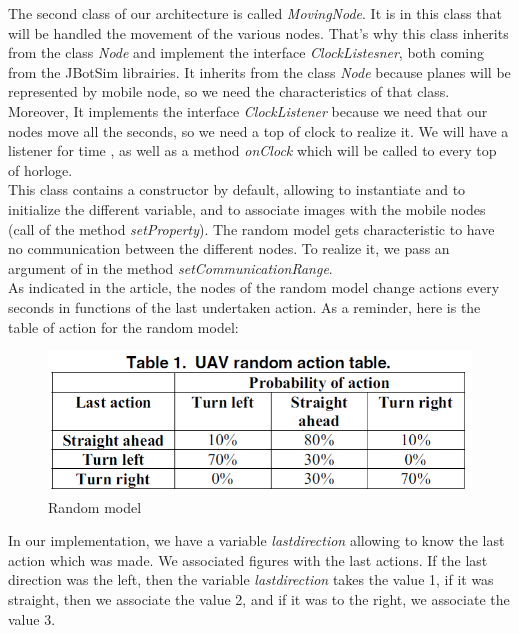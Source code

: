 The second class of our architecture is called \textit{MovingNode}. It is in this class that will be handled the movement of the various nodes. That's why this class inherits from the class \textit{Node} and implement the interface \textit{ClockListesner}, both coming from the JBotSim librairies. It inherits from the class \textit{Node} because planes will be represented by mobile node, so we need the characteristics of that class. Moreover, It implements the interface \textit{ClockListener} because we need that our nodes move all the seconds, so we need a top of clock to realize it. We will have a listener for time , as well as a method \textit{onClock} which will be called to every top of horloge.\\

This class contains a constructor by default, allowing to instantiate and to initialize the different variable, and to associate images with the mobile nodes (call of the method \textit{setProperty}). The random model gets characteristic to have no communication between the different nodes. To realize it, we pass an argument of  in the method \textit{setCommunicationRange}.\\

As indicated in the article, the nodes of the random model change actions every seconds in functions of the last undertaken action. As a reminder, here is the table of action for the random model:\\

\begin{figure}[h]
\center
\includegraphics{../images/table_random.png}
\caption{Random model}
\end{figure}

In our implementation, we have a variable \textit{lastdirection} allowing to know the last action which was made. We associated figures with the last actions. If the last direction was the left, then the variable \textit {lastdirection} takes the value 1, if it was straight, then we associate the value 2, and if it was to the right, we associate the value 3.\\

